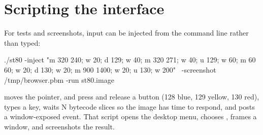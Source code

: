 \section{Scripting the interface}

For tests and screenshots, input can be injected from the command line rather
than typed:

\begin{sh}
./st80 -inject "m 320 240; w 20; d 129; w 40; m 320 271; w 40; u 129; w 60;
                m 60 60; w 20; d 130; w 20; m 900 1400; w 20; u 130; w 200" \
       -screenshot /tmp/browser.pbm -run st80.image
\end{sh}

 moves the pointer,  and  press and release a button
(128 blue, 129 yellow, 130 red), \ct{k} types a key, \ct{w N} waits N bytecode
slices so the image has time to respond, and \ct{x} posts a window-exposed
event. That script opens the desktop menu, chooses \ct{browser}, frames a
window, and screenshots the result.
